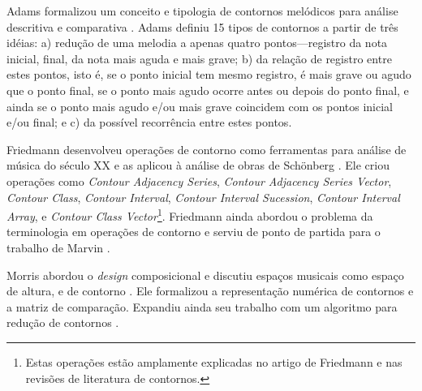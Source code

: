 \documentclass[12pt]{article}
\newcommand{\eng}[1]{\textit{#1}}
\begin{document}


Adams formalizou um conceito e tipologia de contornos melódicos para
análise descritiva e comparativa \cite{adams76:melodic}. Adams definiu
15 tipos de contornos a partir de três idéias: a) redução de uma
melodia a apenas quatro pontos---registro da nota inicial, final, da
nota mais aguda e mais grave; b) da relação de registro entre estes
pontos, isto é, se o ponto inicial tem mesmo registro, é mais grave ou
agudo que o ponto final, se o ponto mais agudo ocorre antes ou depois
do ponto final, e ainda se o ponto mais agudo e/ou mais grave
coincidem com os pontos inicial e/ou final; e c) da possível
recorrência entre estes pontos.


Friedmann desenvolveu operações de contorno como ferramentas para
análise de música do século XX e as aplicou à análise de obras de
Schönberg \cite{friedmann85:methodology}. Ele criou operações como
\eng{Contour Adjacency Series}, \eng{Contour Adjacency Series Vector},
\eng{Contour Class}, \eng{Contour Interval}, \eng{Contour Interval
  Sucession}, \eng{Contour Interval Array}, e \eng{Contour Class
  Vector}\footnote{Estas operações estão amplamente explicadas no
  artigo de Friedmann e nas revisões de literatura de
  contornos.}. Friedmann ainda abordou o problema da terminologia em
operações de contorno \cite{friedmann87:response} e serviu de ponto de
partida para o trabalho de Marvin \cite{marvin88:generalized}.


Morris abordou o \eng{design} composicional e discutiu espaços
musicais como espaço de altura, e de contorno
\cite{morris87:composition}. Ele formalizou a representação numérica
de contornos e a matriz de comparação. Expandiu ainda seu trabalho com
um algoritmo para redução de contornos \cite{morris93:directions}.

\end{document}
